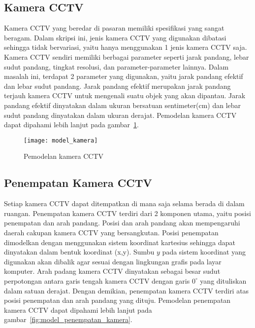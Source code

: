 \subsection{Kamera CCTV}
Kamera CCTV yang beredar di pasaran memiliki spesifikasi yang sangat beragam. Dalam skripsi ini, jenis kamera CCTV yang digunakan dibatasi sehingga tidak bervariasi, yaitu hanya menggunakan 1 jenis kamera CCTV saja. Kamera CCTV sendiri memiliki berbagai parameter seperti jarak pandang, lebar sudut pandang, tingkat resolusi, dan parameter-parameter lainnya. Dalam masalah ini, terdapat 2 parameter yang digunakan, yaitu jarak pandang efektif dan lebar sudut pandang. Jarak pandang efektif merupakan jarak pandang terjauh kamera CCTV untuk mengenali suatu objek yang akan dipantau. Jarak pandang efektif dinyatakan dalam ukuran bersatuan sentimeter(cm) dan lebar sudut pandang dinyatakan dalam ukuran derajat. Pemodelan kamera CCTV dapat dipahami lebih lanjut pada gambar~\ref{fig:model_kamera}.


\begin{figure}[h]
	\centering  
	\texttt{[image: model\_kamera]}
	\caption[Pemodelan kamera CCTV]{Pemodelan kamera CCTV} 
	\label{fig:model_kamera}
\end{figure}

\subsection{Penempatan Kamera CCTV}
Setiap kamera CCTV dapat ditempatkan di mana saja selama berada di dalam ruangan. Penempatan kamera CCTV terdiri dari 2 komponen utama, yaitu posisi penempatan dan arah pandang. Posisi dan arah pandang akan mempengaruhi daerah cakupan kamera CCTV yang bersangkutan. Posisi penempatan dimodelkan dengan menggunakan sistem koordinat kartesius sehingga dapat dinyatakan dalam bentuk koordinat (x,y). Sumbu \(y\) pada sistem koordinat yang digunakan akan dibalik agar sesuai dengan lingkungan grafis pada layar komputer. Arah padang kamera CCTV dinyatakan sebagai besar sudut perpotongan antara garis tengah kamera CCTV dengan garis \(0^\circ\) yang dituliskan dalam satuan derajat. Dengan demikian, penempatan kamera CCTV terdiri atas posisi penempatan dan arah pandang yang dituju. Pemodelan penempatan kamera CCTV dapat dipahami lebih lanjut pada gambar~\ref{fig:model_penempatan_kamera}.

